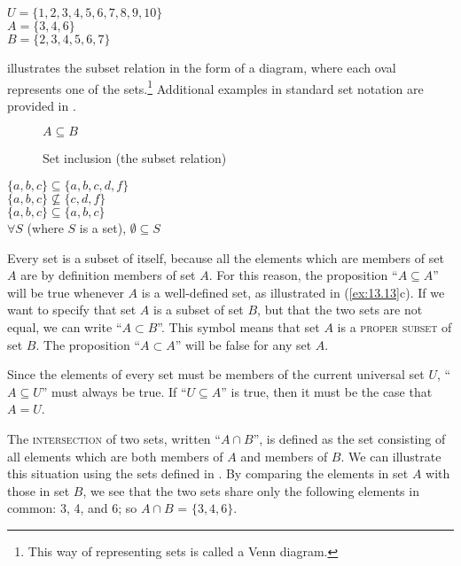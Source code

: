 \ea \label{ex:13.12}
$U = \{1,2,3,4,5,6,7,8,9,10\}$\\
$A = \{3,4,6\}$\\
$B = \{2,3,4,5,6,7\}$
\z


 illustrates the subset relation in the form of a diagram, where each oval represents one of the sets.\footnote{This way of representing sets is called a Venn diagram.} Additional examples in standard set notation are provided in .


\begin{figure}

  $A\subseteq B$\\

\caption{\label{fig:13:1} Set inclusion (the subset relation)}
\end{figure}

\ea \label{ex:13.13}
\ea $\{a,b,c\} \subseteq \{a,b,c,d,f\}$\\
\ex $\{a,b,c\}  \nsubseteq \{c,d,f\}$ \\
\ex $\{a,b,c\}  \subseteq \{a,b,c\}$\\
\ex $\forall S$ (where $S$ is a set), $\emptyset \subseteq S$
                       \z
\z


Every set is a subset of itself, because all the elements which are members of set $A$ are by definition members of set $A$. For this reason, the proposition “$A\subseteq A$” will be true whenever $A$ is a well-defined set, as illustrated in (\ref{ex:13.13}c). If we want to specify that set $A$ is a subset of set $B$, but that the two sets are not equal, we can write “$A\subset B$”. This symbol means that set $A$ is a \textsc{proper subset} of set $B$. The proposition “$A\subset A$” will be false for any set $A$.



Since the elements of every set must be members of the current universal set $U$, “$A\subseteq U$” must always be true. If “$U\subseteq A$” is true, then it must be the case that $A=U$.



The \textsc{intersection} of two sets, written “$A\cap B$”, is defined as the set consisting of all elements which are both members of $A$ and members of $B$. We can illustrate this situation using the sets defined in . By comparing the elements in set $A$ with those in set $B$, we see that the two sets share only the following elements in common: 3, 4, and 6; so $A\cap B$ = $\{3,4,6\}$.


